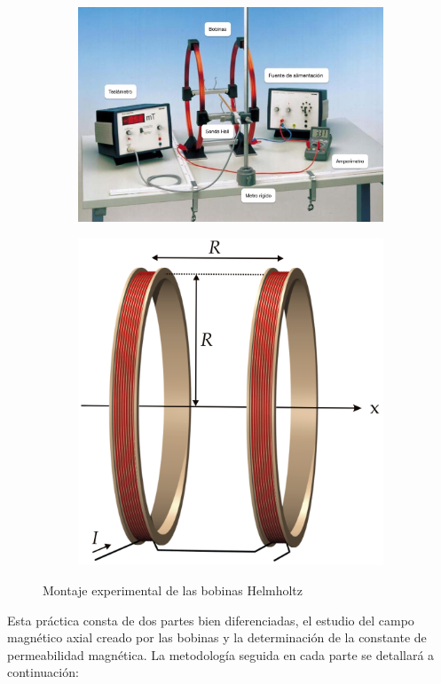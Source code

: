 \documentclass[a4paper,12pt,titlepage]{article}
\begin{document}
\begin{figure}[h!]
    \begin{subfigure}{0.6\textwidth}
        \centering
        \includegraphics[width=0.95\linewidth]{Images/Bobinas configuración-1.jpg}
    \end{subfigure}
    \begin{subfigure}{0.52\textwidth}
        \centering
        \includegraphics[width=0.75\linewidth]{Images/bobinas esquema.png}
    \end{subfigure}
    \caption{Montaje experimental de las bobinas Helmholtz}
\end{figure}

\par Esta práctica consta de dos partes bien diferenciadas, el estudio del campo magnético axial creado por las bobinas y la determinación de la constante de permeabilidad magnética. La metodología seguida en cada parte se detallará a continuación:
\end{document}
